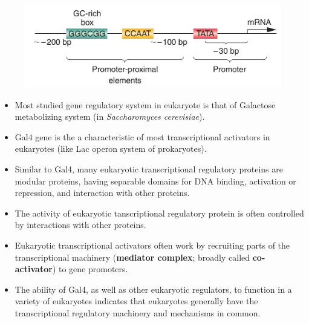 \documentclass[11pt,dvipsnames,ignorenonframetext,aspectratio=169]{beamer}
\providecommand{\tightlist}{%
  \setlength{\itemsep}{0pt}\setlength{\parskip}{0pt}}
\begin{document}
\begin{frame}{}
\protect\hypertarget{section-16}{}

\begin{figure}
\includegraphics[width=0.65\linewidth]{../images/promoter_promoter_proximal_elements} \end{figure}

\end{frame}

\begin{frame}{}
\protect\hypertarget{section-17}{}

\begin{itemize}
\tightlist
\item
  Most studied gene regulatory system in eukaryote is that of Galactose
  metabolizing system (in \emph{Saccharomyces cerevisiae}).
\item
  Gal4 gene is the a characteristic of most transcriptional activators
  in eukaryotes (like Lac operon system of prokaryotes).
\item
  Similar to Gal4, many eukaryotic transcriptional regulatory proteins
  are modular proteins, having separable domains for DNA binding,
  activation or repression, and interaction with other proteins.
\item
  The activity of eukaryotic tanscriptional regulatory protein is often
  controlled by interactions with other proteins.
\item
  Eukaryotic transcriptional activators often work by recruiting parts
  of the transcriptional machinery (\textbf{mediator complex}; broadly
  called \textbf{co-activator}) to gene promoters.
\item
  The ability of Gal4, as well as other eukaryotic regulators, to
  function in a variety of eukaryotes indicates that eukaryotes
  generally have the transcriptional regulatory machinery and mechanisms
  in common.
\end{itemize}

\end{frame}
\end{document}
